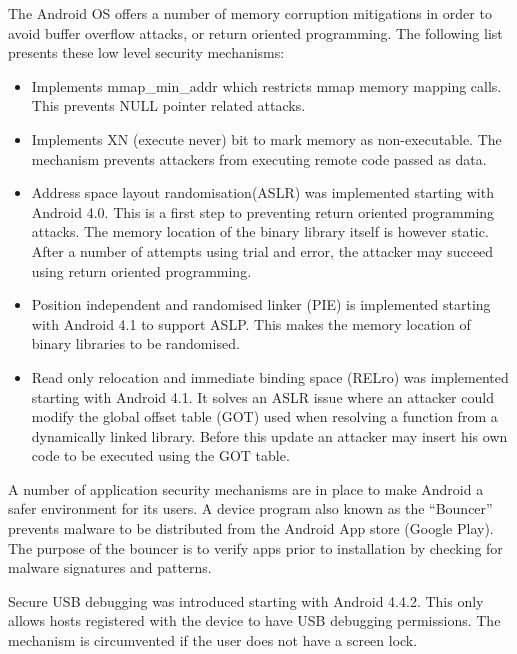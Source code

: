 The Android OS offers a number of memory corruption mitigations in order to avoid buffer overflow attacks, or return oriented programming. The following list 
presents these low level security mechanisms:
\begin{itemize}
	\item Implements mmap\_min\_addr which restricts mmap memory mapping calls. This prevents NULL pointer related attacks.
	\item Implements XN (execute never) bit to mark memory as non-executable. The mechanism prevents attackers from executing remote code passed as data.
	\item Address space layout randomisation(ASLR) was implemented starting with Android 4.0. This is a first step to preventing return oriented programming attacks. The memory location of the binary library itself is however static. After a number of attempts using trial and error, the attacker may succeed using return oriented programming.
	\item Position independent and randomised linker (PIE) is implemented starting with Android 4.1 to support ASLP. This makes the memory location of binary libraries to be randomised.
	\item Read only relocation and immediate binding space (RELro) was implemented starting with Android 4.1. It solves an ASLR issue where an attacker could modify the global offset table (GOT) used when resolving a function from a dynamically linked library. Before this update an attacker may insert his own code to be executed using the GOT table.
\end{itemize}

A number of application security mechanisms are in place to make Android a safer environment for its users. A device program also known as the ``Bouncer'' prevents malware to be distributed from the Android App store (Google Play). The purpose of the bouncer is to verify apps prior to installation by checking for malware signatures and patterns. 

Secure USB debugging was introduced starting with Android 4.4.2. This only allows hosts registered with the device to have USB debugging permissions. The mechanism is circumvented if the user does not have a screen lock.

